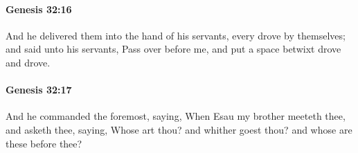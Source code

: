 		\paragraph{Genesis 32:16} %
			\label{GENESIS-32-16}

			And he delivered them into the hand of his servants, every drove by themselves; and said unto his servants, Pass over before me, and put a space betwixt drove and drove.


		\paragraph{Genesis 32:17} %
			\label{GENESIS-32-17}

			And he commanded the foremost, saying, When Esau my brother meeteth thee, and asketh thee, saying, Whose art thou? and whither goest thou? and whose are these before thee?


